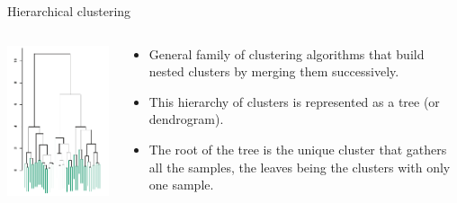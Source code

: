 \documentclass{beamer}
\begin{document}
\begin{frame}{Hierarchical clustering}

\begin{columns}[T]

\begin{column}{0.33\textwidth}
\includegraphics[scale=0.75]{./figures/hierarchy.png}
\end{column}
\begin{column}{0.66\textwidth}
\begin{itemize}
\item General family of clustering algorithms that {\color{blue}build nested clusters by merging them successively}.\\[2em]

\item This hierarchy of clusters is represented as a tree (or dendrogram).\\[2em]

\item The root of the tree is the unique cluster that gathers all the samples, the leaves being the clusters with only one sample.
\end{itemize}
\end{column}

\end{columns}

\end{frame}


\end{document}

